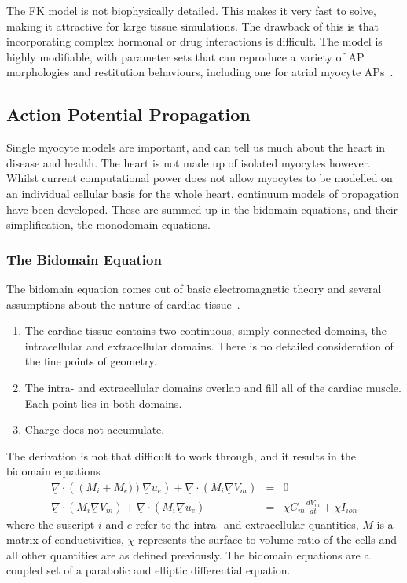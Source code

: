 The FK model is not biophysically detailed.
This makes it very fast to solve, making it attractive for large tissue
simulations.
The drawback of this is that incorporating complex hormonal or drug interactions
is difficult.
The model is highly modifiable, with parameter sets that can reproduce a variety
of AP morphologies and restitution behaviours, including one for atrial myocyte
APs~\cite{Weber2008}.

\subsection{Action Potential Propagation}

Single myocyte models are important, and can tell us much about the heart in
disease and health.
The heart is not made up of isolated myocytes however.
Whilst current computational power does not allow myocytes to be modelled on an
individual cellular basis for the whole heart, continuum models of propagation
have been developed.
These are summed up in the bidomain equations, and their simplification, the
monodomain equations.

\subsubsection{The Bidomain Equation}

The bidomain equation comes out of basic electromagnetic theory and several
assumptions about the nature of cardiac tissue~\cite{Tung,STUFF}.
\begin{enumerate}
    \item The cardiac tissue contains two continuous, simply connected domains, the intracellular and extracellular domains.
    There is no detailed consideration of the fine points of geometry.
    \item The intra- and extracellular domains overlap and fill all of the cardiac muscle. Each point lies in both domains.
    \item Charge does not accumulate.
\end{enumerate}

The derivation is not that difficult to work through, and it results in the bidomain equations
\begin{align}
\underline{\nabla}\cdot\left(\left(M_{i}+M_{e})\right)\underline{\nabla}u_{e}\right) + \underline{\nabla}\cdot\left( M_{i}\underline{\nabla}V_{m}\right) &=& 0
\label{eqn:intro:math:bidom1}\\
\underline{\nabla}\cdot\left(M_{i}\underline{\nabla}V_{m}\right) + \underline{\nabla}\cdot\left(M_{i}\underline{\nabla}u_{e}\right) &=& \chi C_{m}\frac{dV_{m}}{dt} + \chi{I_{ion}}
\label{eqn:intro:math:bidom2}
\end{align}
where the suscript $i$ and $e$ refer to the intra- and extracellular quantities, $M$ is a matrix of conductivities, $\chi$ represents the surface-to-volume ratio of the cells and all other quantities are as defined previously.
The bidomain equations are a coupled set of a parabolic and elliptic differential equation.

